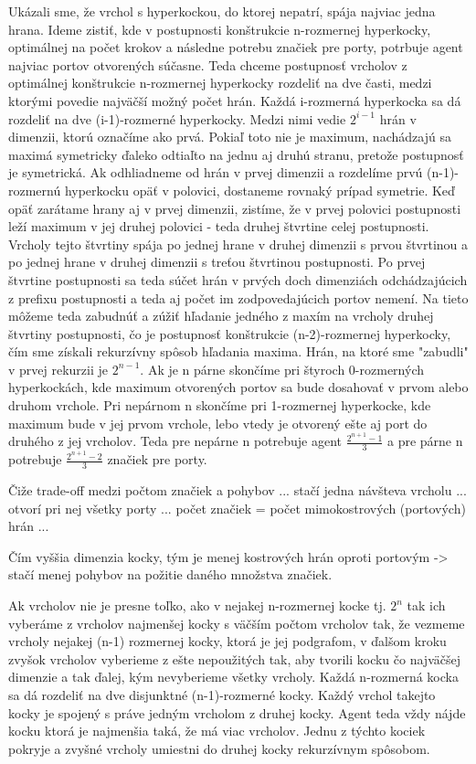 Ukázali sme, že vrchol s hyperkockou, do ktorej nepatrí, spája najviac jedna
hrana. Ideme zistiť, kde v postupnosti konštrukcie n-rozmernej hyperkocky,
optimálnej na počet krokov a následne potrebu značiek pre porty, potrbuje
agent najviac portov otvorených súčasne. Teda chceme postupnosť vrcholov z
 optimálnej konštrukcie n-rozmernej hyperkocky rozdeliť na dve časti, medzi
ktorými povedie najväčší možný počet hrán. Každá i-rozmerná hyperkocka sa dá
rozdeliť na dve (i-1)-rozmerné hyperkocky. Medzi nimi vedie $2^{i-1}$
hrán v dimenzii, ktorú označíme ako prvá. Pokiaľ toto nie je maximum, 
nachádzajú sa maximá symetricky ďaleko odtiaľto na jednu aj druhú stranu,
pretože postupnosť je symetrická. Ak odhliadneme od hrán v prvej dimenzii a
rozdelíme prvú (n-1)-rozmernú hyperkocku opäť v polovici, dostaneme rovnaký
prípad symetrie. Keď opäť zarátame hrany aj v prvej dimenzii, zistíme, že v
prvej polovici postupnosti leží maximum v jej druhej polovici - teda druhej
štvrtine celej postupnosti. Vrcholy tejto štvrtiny spája po jednej hrane v
druhej dimenzii s prvou štvrtinou a po jednej hrane v druhej dimenzii s
treťou štvrtinou postupnosti. Po prvej štvrtine postupnosti sa teda súčet
hrán v prvých doch dimenziách odchádzajúcich z prefixu postupnosti a teda aj
počet im zodpovedajúcich portov nemení. Na tieto môžeme teda zabudnúť 
a zúžiť hľadanie
jedného z maxím na vrcholy druhej štvrtiny postupnosti, čo je postupnosť
konštrukcie (n-2)-rozmernej hyperkocky, čím sme získali rekurzívny spôsob
hľadania maxima. Hrán, na ktoré sme "zabudli" v prvej rekurzii je $2^{n-1}$.
Ak je n párne skončíme pri štyroch 0-rozmerných hyperkockách, kde maximum
otvorených portov sa bude dosahovať v prvom alebo druhom vrchole. Pri
nepárnom n skončíme pri 1-rozmernej hyperkocke, kde maximum bude v jej prvom
vrchole, lebo vtedy je otvorený ešte aj port do druhého z jej vrcholov.
Teda pre nepárne n potrebuje agent $\frac{2^{n+1} - 1}{3}$ a pre
párne n potrebuje $\frac{2^{n+1} - 2}{3}$ značiek pre porty.

\iffalse
Čiže trade-off medzi počtom značiek a pohybov ... stačí jedna návšteva
vrcholu ... otvorí pri nej všetky porty ... počet značiek = počet 
mimokostrových
(portových) hrán ... 

Čím vyššia dimenzia kocky, tým je menej kostrových hrán oproti portovým ->
stačí menej pohybov na požitie daného množstva značiek.

Ak vrcholov nie je presne toľko, ako v nejakej n-rozmernej kocke tj. ${2}^{n}$
tak ich vyberáme z vrcholov najmenšej kocky s väčším počtom vrcholov tak, že
vezmeme vrcholy nejakej (n-1) rozmernej kocky, ktorá je jej podgrafom, v
ďalšom kroku zvyšok vrcholov vyberieme z ešte nepoužitých tak, aby tvorili kocku
čo najväčšej dimenzie a tak ďalej, kým nevyberieme všetky vrcholy. Každá
n-rozmerná kocka sa dá rozdeliť na dve disjunktné (n-1)-rozmerné kocky.
Každý vrchol takejto kocky je spojený s práve jedným vrcholom z druhej
kocky. Agent teda vždy nájde kocku ktorá je najmenšia taká, že má viac
vrcholov. Jednu z týchto kociek pokryje a zvyšné vrcholy umiestni do druhej
kocky rekurzívnym spôsobom.

